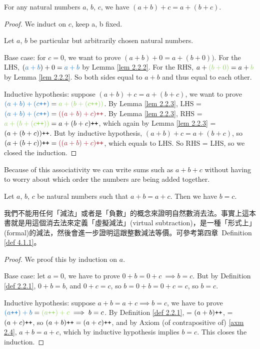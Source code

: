 \begin{proposition}\label{prop  2.2.5} For any natural numbers \(a\), \(b\), \(c\), we have \((a + b) + c = a + (b + c)\).
\end{proposition}
\begin{proof}
We induct on \(c\), keep a, b fixed.

Let \(a\), \(b\) be particular but arbitrarily chosen natural numbers.

Base case: for \(c = 0\), we want to prove \((a + b) + 0 = a + (b + 0))\). For the LHS, \((\BLUE{a + b}) + 0 = \BLUE{a + b}\) by Lemma \ref{lem 2.2.2}. For the RHS, \(a + \GREEN{(b + 0)} = a + \GREEN{b}\) by Lemma \ref{lem 2.2.2}. So both sides equal to \(a + b\) and thus equal to each other.

Inductive hypothesis: suppose \((a + b) + c = a + (b + c)\), we want to prove \(\BLUE{(a + b) + (c\INC)} = \GREEN{a + (b + (c\INC))}\). By Lemma \ref{lem 2.2.3}, LHS = \(\BLUE{(a + b) + (c\INC)} = \MAROON{((a + b) + c)\INC}\). By Lemma \ref{lem 2.2.3}, RHS = \(\GREEN{a + (b + (c\INC))} = a + (b + c)\INC\), which again by Lemma \ref{lem 2.2.3} = \((a + (b + c))\texttt{++}\). But by inductive hypothesis, \((a + b) + c = a + (b + c)\), so \((a + (b + c))\INC = \MAROON{((a + b) + c)\INC}\), which equals to LHS. So RHS = LHS, so we closed the induction.
\end{proof}

\begin{note}
Because of this associativity we can write sums such as \(a + b + c\) without having to worry about which order the numbers are being added together.
\end{note}

\begin{proposition}\label{2.2.6} Let \(a\), \(b\), \(c\) be natural numbers such that \(a + b = a + c\). Then we have \(b = c\).
\end{proposition}
\begin{note}
我們不能用任何「減法」或者是「負數」的概念來證明自然數消去法。事實上這本書就是用這個消去法來定義「虛擬減法」(virtual subtraction)，是一種「形式上」(formal)的減法，然後會進一步證明這跟整數減法等價。可參考第四章\ Definition \ref{def 4.1.1}。
\end{note}
\begin{proof}
We proof this by induction on \(a\).

Base case: let \(a = 0\), we have to prove \(0 + b = 0 + c\ \implies b = c\). But by Definition \ref{def 2.2.1}, \(0 + b = b\), and \(0 + c = c\), so \(b = 0 + b = 0 + c = c\), so \(b = c\).

Inductive hypothesis: suppose \(a + b = a + c \implies b = c\), we have to prove \(\BLUE{(a\INC) + b} = \GREEN{(a\INC) + c} \implies b = c\). By Definition \ref{def 2.2.1},  = \((a + b)\texttt{++}\),  = \((a + c)\texttt{++}\), so \((a + b)\texttt{++} = (a + c)\texttt{++}\), and by Axiom (of contrapositive of) \ref{axm 2.4}, \(a + b = a + c\), which by inductive hypothesis implies \(b = c\). This closes the induction.
\end{proof}

